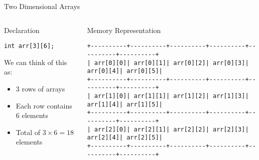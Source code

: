 \documentclass{beamer}
\begin{document}
\begin{frame}{Two Dimensional Arrays}
    \begin{columns}
        \begin{column}{0.5\textwidth}
            \begin{block}{Declaration}
                \begin{lstlisting}
int arr[3][6];
                \end{lstlisting}
            \end{block}
            \vspace{0.5cm}
            We can think of this as:
            \begin{itemize}
                \item 3 rows of arrays
                \item Each row contains 6 elements
                \item Total of $3 \times 6 = 18$ elements
            \end{itemize}
        \end{column}
        \begin{column}{0.5\textwidth}
            \begin{block}{Memory Representation}
                \begin{lstlisting}[basicstyle=\ttfamily\footnotesize]
+----------+----------+----------+----------+----------+----------+
| arr[0][0]| arr[0][1]| arr[0][2]| arr[0][3]| arr[0][4]| arr[0][5]|
+----------+----------+----------+----------+----------+----------+
| arr[1][0]| arr[1][1]| arr[1][2]| arr[1][3]| arr[1][4]| arr[1][5]|
+----------+----------+----------+----------+----------+----------+
| arr[2][0]| arr[2][1]| arr[2][2]| arr[2][3]| arr[2][4]| arr[2][5]|
+----------+----------+----------+----------+----------+----------+
                \end{lstlisting}
            \end{block}
        \end{column}
    \end{columns}
\end{frame}
\end{document}
